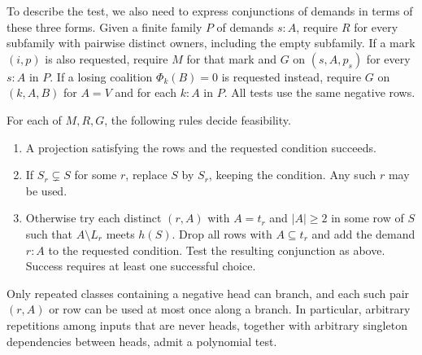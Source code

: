 To describe the test, we also need to express conjunctions of demands
in terms of these three forms. Given a finite family $P$ of demands
$s:A$, require $R$ for every subfamily with pairwise distinct owners,
including the empty subfamily. If a mark $(i,p)$ is also requested,
require $M$ for that mark and $G$ on $(s,A,p_s)$ for every $s:A$ in
$P$. If a losing coalition $\Phi_k(B)=0$ is requested instead, require
$G$ on $(k,A,B)$ for $A=V$ and for each $k:A$ in $P$.
All tests use the same negative rows.

\begin{theorem}
\label{core:thm:repeated-blocker-budgets}
For each of $M,R,G$, the following rules decide feasibility.
\begin{enumerate}
\item A projection satisfying the rows and the requested condition succeeds.
\item If $S_r\subsetneq S$ for some $r$, replace $S$ by $S_r$,
keeping the condition. Any such $r$ may be used.
\item Otherwise try each distinct $(r,A)$ with $A=t_r$ and $|A|\ge2$
in some row of $S$ such that $A\setminus L_r$ meets $h(S)$.
Drop all rows with $A\subseteq t_r$ and add the
demand $r:A$ to the requested condition. Test the resulting conjunction
as above. Success requires at least one successful choice.
\end{enumerate}
Only repeated classes containing a negative head can branch, and each
such pair $(r,A)$ or row can be used at most once along a branch.
In particular, arbitrary repetitions among inputs that are never heads,
together with arbitrary singleton dependencies between heads, admit a
polynomial test.
\end{theorem}
